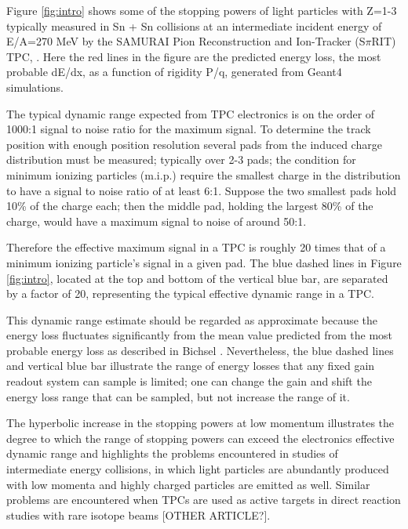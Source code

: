 \documentclass[review]{elsarticle}
\begin{document}
Figure \ref{fig:intro} shows some of the stopping powers of light particles with Z=1-3 typically measured in Sn + Sn collisions at an intermediate incident energy of E/A=270 MeV by the SAMURAI Pion Reconstruction and Ion-Tracker (S$\pi$RIT) TPC, \cite{shane}. Here the red lines in the figure are the predicted energy loss, the most probable dE/dx, as a function of rigidity P/q, generated from Geant4 simulations. 

The typical dynamic range expected from TPC electronics is on the order of 1000:1 signal to noise ratio for the maximum signal. To determine the track position with enough position resolution several pads from the induced charge distribution must be measured; typically over 2-3 pads; the condition for minimum ionizing particles (m.i.p.) require the smallest charge in the distribution to have a signal to noise ratio of at least 6:1. Suppose the two smallest pads hold 10\% of the charge each; then the middle pad, holding the largest 80\% of the charge, would have a maximum signal to noise of around 50:1. 

 Therefore the effective maximum signal in a TPC is roughly 20 times that of a minimum ionizing particle's signal in a given pad. The blue dashed lines in Figure \ref{fig:intro}, located at the top and bottom of the vertical blue bar, are separated by a factor of 20, representing the typical effective dynamic range in a TPC. 

This dynamic range estimate should be regarded as approximate because the energy loss fluctuates significantly from the mean value predicted from the most probable energy loss as described in Bichsel \cite{bichsel}. Nevertheless, the blue dashed lines and vertical blue bar illustrate the range of energy losses that any fixed gain readout system can sample is limited; one can change the gain and shift the energy loss range that can be sampled, but not increase the range of it. 

The hyperbolic increase in the stopping powers at low momentum illustrates the degree to which the range of stopping powers can exceed the electronics effective dynamic range and highlights the problems encountered in studies of intermediate energy collisions, in which light particles are abundantly produced with low momenta and highly charged particles are emitted as well. Similar problems are encountered when TPCs are used as active targets in direct reaction studies with rare isotope beams \cite{pattpc}[OTHER ARTICLE?]. 
\end{document}
